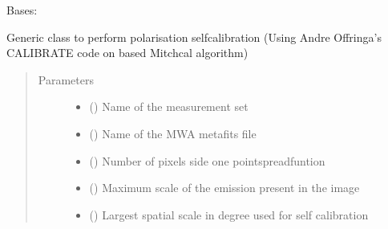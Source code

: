 \documentclass[letterpaper,10pt,english]{sphinxmanual}
\begin{document}
\begin{fulllineitems}
\label{\detokenize{paircars:paircars.fullpol_selfcal_LTS.PolSelfcal}}
\sphinxAtStartPar
Bases: 

\sphinxAtStartPar
Generic class to perform polarisation self\sphinxhyphen{}calibration (Using Andre Offringa’s CALIBRATE code on based Mitchcal algorithm)
\begin{quote}\begin{description}
\item[{Parameters}] \leavevmode\begin{itemize}
\item {} 
\sphinxAtStartPar
{} () \textendash{} Name of the measurement set

\item {} 
\sphinxAtStartPar
{} () \textendash{} Name of the MWA metafits file

\item {} 
\sphinxAtStartPar
{} () \textendash{} Number of pixels side one point\sphinxhyphen{}spread\sphinxhyphen{}funtion

\item {} 
\sphinxAtStartPar
{} () \textendash{} Maximum scale of the emission present in the image

\item {} 
\sphinxAtStartPar
{} () \textendash{} Largest spatial scale in degree used for self calibration


\end{itemize}
\end{description}
\end{quote}
\end{fulllineitems}
\end{document}
